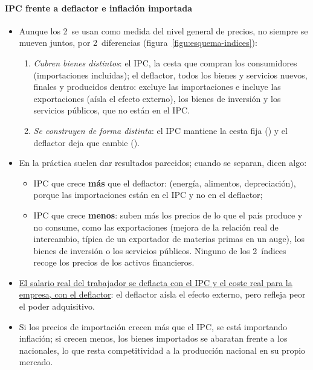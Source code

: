 \documentclass[11pt]{article}
\begin{document}
\paragraph{IPC frente a deflactor e inflación importada}
\begin{itemize}
\item Aunque los 2~se usan como medida del nivel general de precios, no siempre se mueven juntos, por 2~diferencias (figura~\ref{figu:esquema-indices}):
  \begin{enumerate}
  \item \emph{Cubren bienes distintos}: el IPC, la cesta que compran los consumidores (importaciones incluidas); el deflactor, todos los bienes y servicios nuevos, finales y producidos dentro: excluye las importaciones e incluye las exportaciones (aísla el efecto externo), los bienes de inversión y los servicios públicos, que no están en el IPC.
  \item \emph{Se construyen de forma distinta}: el IPC mantiene la cesta fija () y el deflactor deja que cambie ().
  \end{enumerate}
\item En la práctica suelen dar resultados parecidos; cuando se separan, dicen algo:
  \begin{itemize}
  \item IPC que crece \textbf{más} que el deflactor:  (energía, alimentos, depreciación), porque las importaciones están en el IPC y no en el deflactor;
  \item IPC que crece \textbf{menos}: suben más los precios de lo que el país produce y no consume, como las exportaciones (mejora de la relación real de intercambio, típica de un exportador de materias primas en un auge), los bienes de inversión o los servicios públicos. Ninguno de los 2~índices recoge los precios de los activos financieros.
  \end{itemize}
\item \uline{El salario real del trabajador se deflacta con el IPC y el coste real para la empresa, con el deflactor}: el deflactor aísla el efecto externo, pero refleja peor el poder adquisitivo.
\item Si los precios de importación crecen más que el IPC, se está importando inflación; si crecen menos, los bienes importados se abaratan frente a los nacionales, lo que resta competitividad a la producción nacional en su propio mercado.
\end{itemize}
\end{document}
